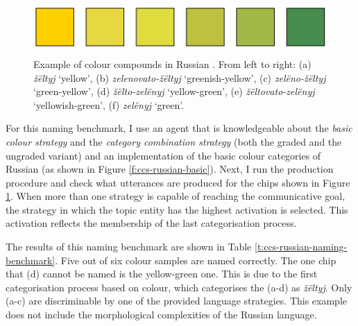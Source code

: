 \begin{figure}[htpb]
  \centering
  \includegraphics[width=.6\textwidth]{./category-combination/figures/russian-compounds.pdf}
  \caption[Example of colour compounds in Russian]{Example of colour
    compounds in Russian \citep{safuanova07russian}. From left to
    right: (a) \textit{\v z\"eltyj} `yellow', (b) \textit{zelenovato-\v z\"eltyj} 
    `greenish-yellow', (c) \textit{zel\"eno-\v z\"eltyj} `green-yellow',
    (d) \textit{\v z\"elto-zel\"enyj} `yellow-green', (e) \textit{\v z\"eltovato-zel\"enyj}
    `yellowish-green', (f) \textit{zel\"enyj} `green'.}
  \label{f:ccs-russian-compounds}
\end{figure}

For this naming benchmark, 
I use an agent that is knowledgeable about
the \emph{basic colour strategy} and the \emph{category combination
  strategy} (both the graded and the ungraded variant) and an implementation of the
basic colour categories of Russian (as shown in Figure
\ref{f:ccs-russian-basic}). Next, I run the production procedure and
check what utterances are produced for the chips shown in Figure
\ref{f:ccs-russian-compounds}. When more than one strategy is capable
of reaching the communicative goal, the strategy in which the topic
entity has the highest activation is selected. This activation
reflects the membership of the last categorisation process.

The results of this naming benchmark are shown in Table
\ref{t:ccs-russian-naming-benchmark}. Five out of six colour samples
are named correctly. The one chip that (d) cannot be named is the
yellow-green one. This is due to the first categorisation process
based on colour, which categorises the (a-d) as \textit{\v z\"eltyj}. Only (a-c)
are discriminable by one of the provided language strategies. This
example does not include the morphological complexities of the Russian
language.

